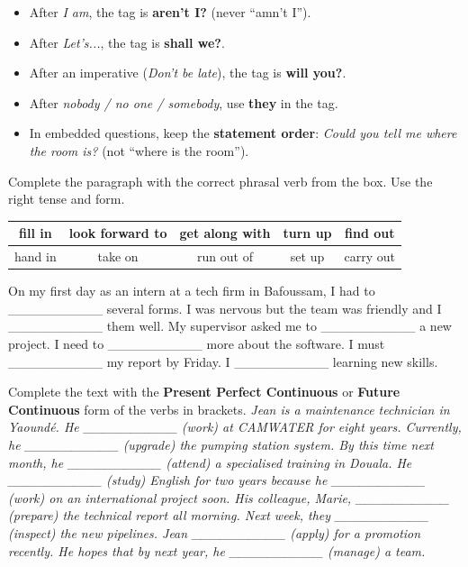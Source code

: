 \documentclass[11pt]{article}
\newcounter{popsec}
\newcounter{popsub}
\newcommand{\courssub}[1]{%
  \stepcounter{popsub}%
  \par\vspace{9pt}\noindent{\popxbold\fontsize{11.5}{13}\selectfont\color{popink}{\color{poporange}\thepopsec.\thepopsub}\hspace{6pt}#1}\par\nopagebreak\vspace{4pt}
}
\begin{document}
\begin{attention}
\begin{itemize}
    \item After \emph{I am}, the tag is \textbf{aren't I?} (never ``amn't I'').
    \item After \emph{Let's...}, the tag is \textbf{shall we?}.
    \item After an imperative (\emph{Don't be late}), the tag is \textbf{will you?}.
    \item After \emph{nobody / no one / somebody}, use \textbf{they} in the tag.
    \item In embedded questions, keep the \textbf{statement order}: \emph{Could you tell me where the room is?} (not ``where is the room'').
\end{itemize}
\end{attention}

\begin{exercice}
Complete the paragraph with the correct phrasal verb from the box. Use the right tense and form.
\begin{center}
\begin{tabular}{|c|c|c|c|c|}\hline
fill in & look forward to & get along with & turn up & find out \\ \hline
hand in & take on & run out of & set up & carry out \\ \hline
\end{tabular}
\end{center}
On my first day as an intern at a tech firm in Bafoussam, I had to \_\_\_\_\_\_\_\_\_\_ several forms. I was nervous but the team was friendly and I \_\_\_\_\_\_\_\_\_\_ them well. My supervisor asked me to \_\_\_\_\_\_\_\_\_\_ a new project. I need to \_\_\_\_\_\_\_\_\_\_ more about the software. I must \_\_\_\_\_\_\_\_\_\_ my report by Friday. I \_\_\_\_\_\_\_\_\_\_ learning new skills.
\end{exercice}

\courssub{Je me prépare au Bac}

\begin{exercice}
Complete the text with the \textbf{Present Perfect Continuous} or \textbf{Future Continuous} form of the verbs in brackets.
\textit{Jean is a maintenance technician in Yaoundé. He \_\_\_\_\_\_\_\_\_\_ (work) at CAMWATER for eight years. Currently, he \_\_\_\_\_\_\_\_\_\_ (upgrade) the pumping station system. By this time next month, he \_\_\_\_\_\_\_\_\_\_ (attend) a specialised training in Douala. He \_\_\_\_\_\_\_\_\_\_ (study) English for two years because he \_\_\_\_\_\_\_\_\_\_ (work) on an international project soon. His colleague, Marie, \_\_\_\_\_\_\_\_\_\_ (prepare) the technical report all morning. Next week, they \_\_\_\_\_\_\_\_\_\_ (inspect) the new pipelines. Jean \_\_\_\_\_\_\_\_\_\_ (apply) for a promotion recently. He hopes that by next year, he \_\_\_\_\_\_\_\_\_\_ (manage) a team.}
\end{exercice}
\end{document}
